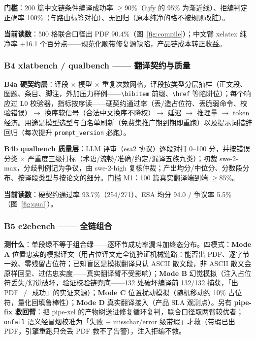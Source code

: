 \textbf{门槛}：200 篇中文链条件编译成功率 $\geq$90\%（hjfy 的 95\% 为渐近线）、拒编判定正确率 100\%（与路由标签对拍）、无回归（原本纯净的格不被规则改脏）。

\textbf{当前读数}：500 格联合口径出 PDF 90.4\%（图~\ref{fig:compile}）；中文臂 xelatex 纯净率 +16.1 个百分点——规范化顺带修复源缺陷，产品链成本转正收益。

\subsubsection{B4 xlatbench / qualbench —— 翻译契约与质量}

\textbf{B4a 硬契约层}：译段 $\times$ 模型 $\times$ 重复次数网格，译段按类型分层抽样（正文段、图题、条目、脚注，外加压力样例——\verb|\bibitem| 前缀、\verb|\href| 等陷阱位）；每个响应过 L0 校验器，指标按序读——硬契约通过率（丢/造占位符、丢脆弱命令、校验错误）$\to$ 换序软信号（合法中文换序不降权）$\to$ 延迟 $\to$ 推理量 $\to$ token 经济。用途是模型选型与白名单刷新（免费集推广期到期即重跑）以及提示词措辞回归（每次提升 \texttt{prompt\_version} 必跑）。

\textbf{B4b qualbench 质量层}：LLM 评审（esa2 协议）逐段对打 0--100 分，并按错误分类 $\times$ 严重度三级打标（术语/流畅/准确/约定/漏译五族九类）；初裁 swe-2-max，分歧判例记为争议，由 swe-2-high 复核仲裁；产出均分/中位分、分数段分布、按译段类型与按论文的细分。门槛 M1：100 篇真实翻译端到端 $\geq$85\%。

\textbf{当前读数}：硬契约通过率 93.7\%（254/271）、ESA 均分 94.0 / 争议率 5.5\%（图~\ref{fig:qual}）。

\subsubsection{B5 e2ebench —— 全链组合}

\textbf{测什么}：单段绿不等于组合绿——逐环节成功率漏斗加终态分布。四模式：\textbf{Mode A} 位置忠实的模拟译文（用占位译文走全链验证机械链路：能否出 PDF、逐字节一致、零残留占位符；已知盲区是模拟翻译只认 ASCII 散文段，非 ASCII 散文会原样回显、过估忠实度——真实翻译臂不受影响）；\textbf{Mode B} 幻觉模拟（注入占位符丢失/幻觉破坏，验证校验链兜底——132 处破坏编译前 132/132 捕获，「出 PDF $\neq$ 成功」的实证来源）；\textbf{Mode C} 位置扰动模拟（随机移动约 10\% 占位符，量化回填鲁棒性）；\textbf{Mode D} 真实翻译接入（产品 SLA 观测点）。另有 \textbf{pipe-fix 救回臂}：把 pipe-xel 的产物树送进修复循环复判，联合口径取两臂较优者；\texttt{onfail} 语义经冒烟校准为「失败 + misschar/error 级带瑕」才救（带瑕已出 PDF，引擎重跑只会丢 PDF 救不了告警），注入拒编不救。


